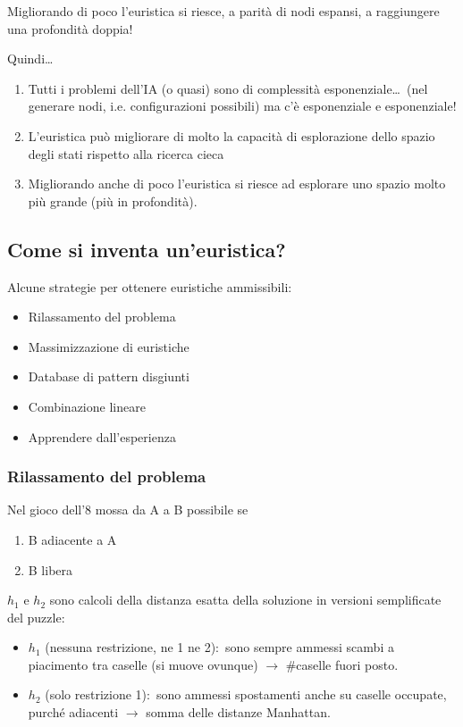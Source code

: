 \noindent Migliorando di poco l'euristica si riesce, a parità di nodi espansi, a raggiungere una profondità doppia!

\noindent Quindi\dots
\begin{enumerate}
	\item Tutti i problemi dell'IA (o quasi) sono di complessità esponenziale\dots\ (nel generare nodi, i.e. configurazioni possibili) ma c'è esponenziale e esponenziale!
	\item L'euristica può migliorare di molto la capacità di esplorazione dello spazio degli stati rispetto alla ricerca cieca
	\item Migliorando anche di poco l'euristica si riesce ad esplorare uno spazio molto più grande (più in profondità).
\end{enumerate}

\subsection{Come si inventa un'euristica?}

Alcune strategie per ottenere euristiche ammissibili:
\begin{itemize}
	\item Rilassamento del problema
	\item Massimizzazione di euristiche
	\item Database di pattern disgiunti
	\item Combinazione lineare
	\item Apprendere dall'esperienza
\end{itemize}
\subsubsection{Rilassamento del problema}
Nel gioco dell'8 mossa da A a B possibile se
\begin{enumerate}
	\item B adiacente a A
	\item B libera
\end{enumerate}
$h_1$ e $h_2$ sono calcoli della distanza esatta della soluzione in versioni semplificate del puzzle:
\begin{itemize}
	\item $h_1$ (nessuna restrizione, ne 1 ne 2):\ sono sempre ammessi scambi a piacimento tra caselle (si muove ovunque) $\rightarrow$ \#caselle fuori posto.
	\item $h_2$ (solo restrizione 1):\ sono ammessi spostamenti anche su caselle occupate, purché adiacenti $\rightarrow$ somma delle distanze Manhattan.
\end{itemize}

